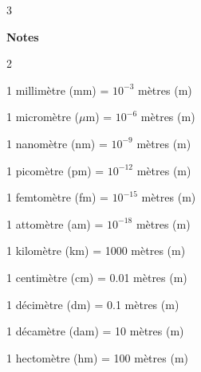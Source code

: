 \documentclass[11pt,a4paper]{article}
\begin{document}
\begin {multicols}{3}
\end{multicols}


\dotfill \textbf{Notes  } \dotfill

\begin{multicols}{2}

1 millimètre (mm) = $10^{-3}$ mètres (m)

1 micromètre ($\mu$m) = $10^{-6}$ mètres (m)

1 nanomètre (nm) = $10^{-9}$ mètres (m)

1 picomètre (pm) = $10^{-12}$ mètres (m)

1 femtomètre (fm) = $10^{-15}$ mètres (m)

1 attomètre (am) = $10^{-18}$ mètres (m)

1 kilomètre (km) = 1000 mètres (m)

1 centimètre (cm) = 0.01 mètres (m)

1 décimètre (dm) = 0.1 mètres (m)

1 décamètre (dam) = 10 mètres (m)

1 hectomètre (hm) = 100 mètres (m)

\end{multicols}

\newpage

\newpage
\end{document}
